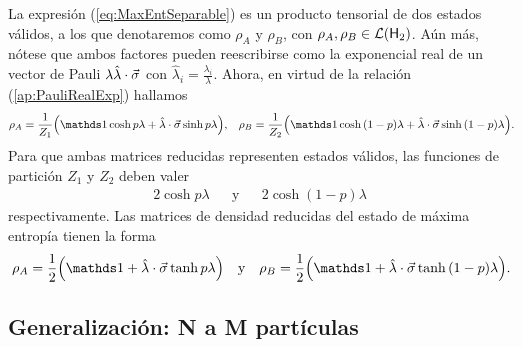 La expresión (\ref{eq:MaxEntSeparable}) es un producto tensorial de dos estados válidos, a los que denotaremos como $\rho_{A}$ y $\rho_{B}$, con $\rho_{A}, \rho_{B}\in\mathcal{L}({\sf H}_{2})$. Aún más, nótese que ambos factores pueden reescribirse como la exponencial real de un vector de Pauli $\lambda\hat{\lambda}\cdot\vec{\sigma}$ con $\hat{\lambda}_{i}=\frac{\lambda_{i}}{\lambda}$. Ahora, en virtud de la relación (\ref{ap:PauliRealExp}) hallamos
\begin{align*}
    \rho_{A}=\frac{1}{Z_{1}}\qty(\Id\cosh{p\lambda}+\paulivec{\lambda}\sinh{p\lambda}), && \rho_{B}=\frac{1}{Z_{2}}\qty(\Id\cosh{(1-p)\lambda}+\paulivec{\lambda}\sinh{(1-p)\lambda})\rlap{.}
\end{align*}
Para que ambas matrices reducidas representen estados válidos, las funciones de partición $Z_{1}$ y $Z_{2}$ deben valer
\begin{align*}
    2\cosh{p\lambda} && \text{y} && 2\cosh{(1-p)\lambda}
\end{align*}
respectivamente. Las matrices de densidad reducidas del estado de máxima entropía tienen la forma
\begin{align}
    \rho_{A}=\frac{1}{2}\qty(\Id+\paulivec{\lambda}\tanh{p\lambda}) && \text{y} && \rho_{B}=\frac{1}{2}\qty(\Id+\paulivec{\lambda}\tanh{(1-p)\lambda})\rlap{.}
\end{align}
\subsection{Generalización: N a M partículas}


